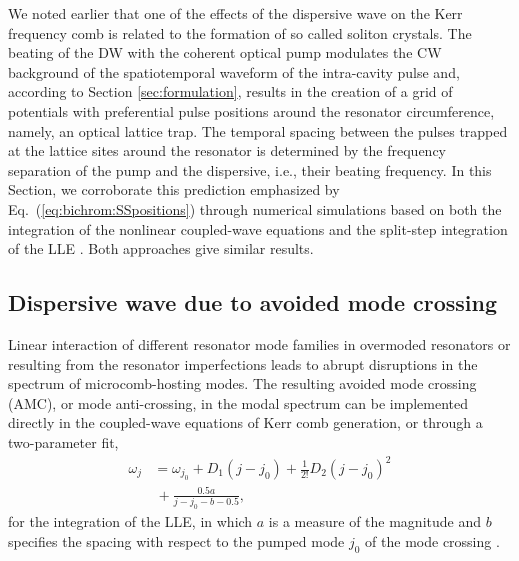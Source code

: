 We noted earlier that one of the effects of the dispersive wave on the Kerr frequency comb is related to the formation of so called soliton crystals. The beating of the DW with the coherent optical pump modulates the CW background of the spatiotemporal waveform of the intra-cavity pulse and, according to Section \ref{sec:formulation}, results in the creation of a grid of potentials with preferential pulse positions around the resonator circumference, namely, an optical lattice trap. The temporal spacing between the pulses trapped at the lattice sites around the resonator is determined by the frequency separation of the pump and the dispersive, i.e., their beating frequency. In this Section, we corroborate this prediction emphasized by Eq.~(\ref{eq:bichrom:SSpositions}) through numerical simulations based on both the integration of the nonlinear coupled-wave equations \cite{chembo2010modal} and the split-step integration of the LLE \cite{coen2013modeling, chembo2013spatiotemporal}. Both approaches give similar results.

\subsection{Dispersive wave due to avoided mode crossing}

Linear interaction of different resonator mode families in overmoded resonators or resulting from the resonator imperfections leads to abrupt disruptions in the spectrum of microcomb-hosting modes. The resulting avoided mode crossing (AMC), or mode anti-crossing, in the modal spectrum can be implemented directly in the coupled-wave equations of Kerr comb generation, or through a two-parameter fit,
%
\begin{align}\label{eq:bichrom:MCdisp}
\omega_j &= \omega_{j_0} + D_1 (j-j_0) + \frac{1}{2!}D_2 (j-j_0)^2 \nonumber \\
& \, + \frac{0.5 a}{j - j_0 - b - 0.5},
\end{align}
%
for the integration of the LLE, in which $a$ is a measure of the magnitude and $b$ specifies the spacing with respect to the pumped mode $j_0$ of the mode crossing \cite{herr2014mode}.

